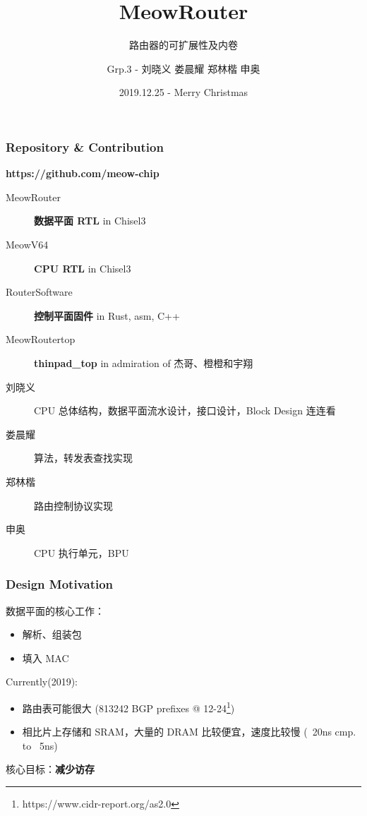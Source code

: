 \documentclass[UTF-8]{ctexbeamer}
\title{MeowRouter}
\subtitle{路由器的可扩展性及内卷}
\author{Grp.3 - 刘晓义\hspace{.2em} 娄晨耀 \hspace{.2em} 郑林楷 \hspace{.2em} 申奥}
\date{2019.12.25 - Merry Christmas}
\begin{document}
\begin{frame}
  \titlepage
\end{frame}
\begin{frame}
  \frametitle{Repository \& Contribution}

  \textbf{https://github.com/meow-chip}

  \begin{description}
    \item[MeowRouter] \textbf{数据平面 RTL} in Chisel3
    \item[MeowV64] \textbf{CPU RTL} in Chisel3
    \item[RouterSoftware] \textbf{控制平面固件} in Rust, asm, C++
    \item[MeowRouter\-top] \textbf{thinpad\_top} in admiration of 杰哥、橙橙和宇翔
  \end{description}

  \vspace{1em}

  \begin{description}
    \item[刘晓义] CPU 总体结构，数据平面流水设计，接口设计，Block Design 连连看
    \item[娄晨耀] 算法，转发表查找实现
    \item[郑林楷] 路由控制协议实现
    \item[申奥] CPU 执行单元，BPU
  \end{description}
\end{frame}
\begin{frame}
  \frametitle{Design Motivation}

  数据平面的核心工作：
  \begin{itemize}
    \item 解析、组装包
    \item 填入 MAC
  \end{itemize}
  \vspace{1em}

  \pause
  \pause

  Currently(2019):

  \begin{itemize}
    \item 路由表可能很大 (813242 BGP prefixes @ 12-24\footnote{https://www.cidr-report.org/as2.0})
    \item 相比片上存储和 SRAM，大量的 DRAM 比较便宜，速度比较慢 (~20ns cmp. to ~5ns)
  \end{itemize}

  \pause
  \vspace{1em}

  核心目标：\textbf{减少访存}
\end{frame}
\end{document}
